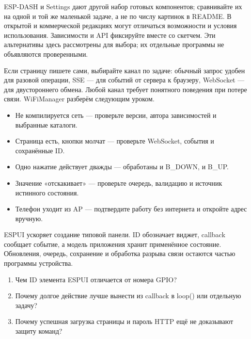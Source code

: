 ESP-DASH и Settings дают другой набор готовых компонентов; сравнивайте их на одной и той же
маленькой задаче, а не по числу картинок в README. В открытой и коммерческой редакциях могут
отличаться возможности и условия использования. Зависимости и API фиксируйте вместе со скетчем.
Эти альтернативы здесь рассмотрены для выбора; их отдельные программы не объявляются проверенными.

Если страницу пишете сами, выбирайте канал по задаче: обычный запрос удобен для разовой операции,
SSE --- для событий от сервера к браузеру, WebSocket --- для двустороннего обмена.
Любой канал требует понятного поведения при потере связи. WiFiManager разберём следующим уроком.

\begin{trouble}
\begin{itemize}[leftmargin=*]
  \item Не компилируется сеть --- проверьте версии, автора зависимостей и выбранные каталоги.
  \item Страница есть, кнопки молчат --- проверьте WebSocket, события и сохранённые ID.
  \item Одно нажатие действует дважды --- обработаны и B\_DOWN, и B\_UP.
  \item Значение «отскакивает» --- проверьте очередь, валидацию и источник истинного состояния.
  \item Телефон уходит из AP --- подтвердите работу без интернета и откройте адрес вручную.
\end{itemize}
\end{trouble}

\begin{summary}
ESPUI ускоряет создание типовой панели. ID обозначает виджет, callback сообщает событие,
а модель приложения хранит применённое состояние. Обновления, очередь, сохранение и
обработка разрыва связи остаются частью программы устройства.
\end{summary}

\begin{selfcheck}
\begin{enumerate}
  \item Чем ID элемента ESPUI отличается от номера GPIO?
  \item Почему долгое действие лучше вынести из callback в loop() или отдельную задачу?
  \item Почему успешная загрузка страницы и пароль HTTP ещё не доказывают защиту команд?
\end{enumerate}
\end{selfcheck}

